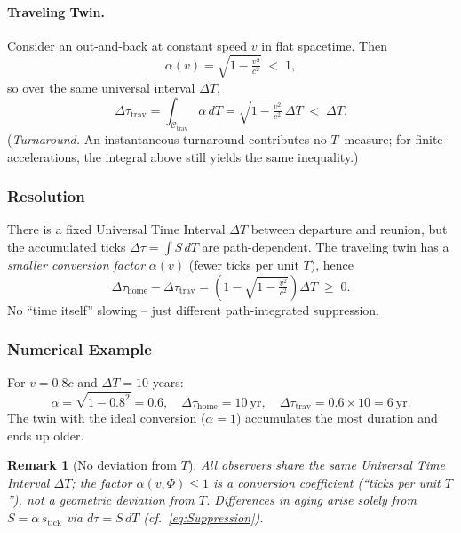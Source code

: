 \documentclass[12pt]{article}
\theoremstyle{plain} %
\newtheorem{remark}{Remark}
\begin{document}
\paragraph{Traveling Twin.}
Consider an out-and-back at constant speed $v$ in flat spacetime. Then
\begin{equation}
\alpha(v)=\sqrt{1-\tfrac{v^2}{c^2}} \;<\; 1,
\label{eq:AlphaTrav}
\end{equation}
so over the same universal interval $\Delta T$,
\begin{equation}
\Delta\tau_{\text{trav}}=\int_{\mathcal{C}_{\text{trav}}} \alpha\, dT
= \sqrt{1-\tfrac{v^2}{c^2}}\, \Delta T \;<\; \Delta T .
\label{eq:TravTwin}
\end{equation}
(\emph{Turnaround.} An instantaneous turnaround contributes no $T$–measure; for finite accelerations, the integral above still yields the same inequality.)

\subsubsection*{Resolution}
There is a fixed Universal Time Interval $\Delta T$ between departure and reunion, but the 
accumulated ticks $\Delta\tau=\int S\,dT$ are path-dependent. The traveling twin has a 
\emph{smaller conversion factor} $\alpha(v)$ (fewer ticks per unit $T$), hence
\begin{equation}
\Delta\tau_{\text{home}}-\Delta\tau_{\text{trav}}
= \left(1-\sqrt{1-\tfrac{v^2}{c^2}}\right)\Delta T \;\ge\; 0.
\label{eq:TwinDifference}
\end{equation}
No “time itself” slowing – just different path-integrated suppression.

\subsubsection*{Numerical Example}
For $v=0.8c$ and $\Delta T=10$ years:
\begin{equation}
\alpha=\sqrt{1-0.8^2}=0.6,\quad 
\Delta\tau_{\text{home}}=10~\text{yr},\quad 
\Delta\tau_{\text{trav}}=0.6\times 10=6~\text{yr}.
\label{eq:NumericExample}
\end{equation}
The twin with the ideal conversion ($\alpha=1$) accumulates the most duration and ends up older.

\begin{remark}[No deviation from $T$]
All observers share the same Universal Time Interval $\Delta T$; the factor $\alpha(v,\Phi)\le 1$ is a 
conversion coefficient (“ticks per unit $T$”), not a geometric deviation from $T$. Differences in aging arise solely from $S=\alpha\,s_{\text{tick}}$ via $d\tau=S\,dT$ (cf.~\eqref{eq:Suppression}).
\end{remark}
\end{document}
